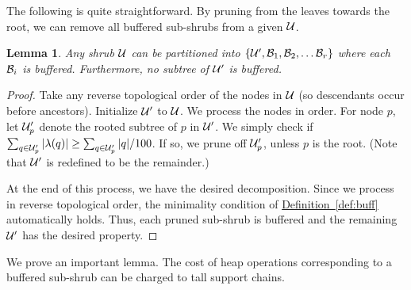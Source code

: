 \documentclass[11pt]{article}
\newtheorem{lemma}[theorem]{Lemma}
\theoremstyle{definition}
\newcommand{\cB}{{\cal B}}
\newcommand{\cU}{{\cal U}}
\newcommand{\Def}[1]{\hyperref[def:#1]{Definition~\ref*{def:#1}}} %
\begin{document}
The following is quite straightforward. By pruning from the leaves towards
the root, we can remove all buffered sub-shrubs from a given $\cU$.

\begin{lemma} \label{lem:split-buff} Any shrub $\cU$ can be partitioned
into $\{\cU', \cB_1, \cB_2, \ldots \cB_r\}$ where each $\cB_i$ is buffered.
Furthermore, no subtree of $\cU'$ is buffered.
\end{lemma}

\begin{proof} Take any reverse topological order of the nodes in $\cU$
(so descendants occur before ancestors). Initialize $\cU'$ to $\cU$.
We process the nodes in order. For node $p$, let $\cU'_p$ denote the rooted
subtree of $p$ in $\cU'$. We simply check if $\sum_{q \in \cU'_p} |\loss(q)| \geq \sum_{q \in \cU'_p} |q|/100$. If so, we prune off $\cU'_p$, unless $p$ is the root. 
(Note that $\cU'$ is redefined
to be the remainder.)

At the end of this process, we have the desired decomposition. Since we process
in reverse topological order, the minimality condition of \Def{buff}
automatically holds. Thus, each pruned sub-shrub is buffered and the remaining $\cU'$
has the desired property.
\end{proof}

We prove an important lemma. The cost of heap operations corresponding 
to a buffered sub-shrub can be charged to tall support chains.
\end{document}
